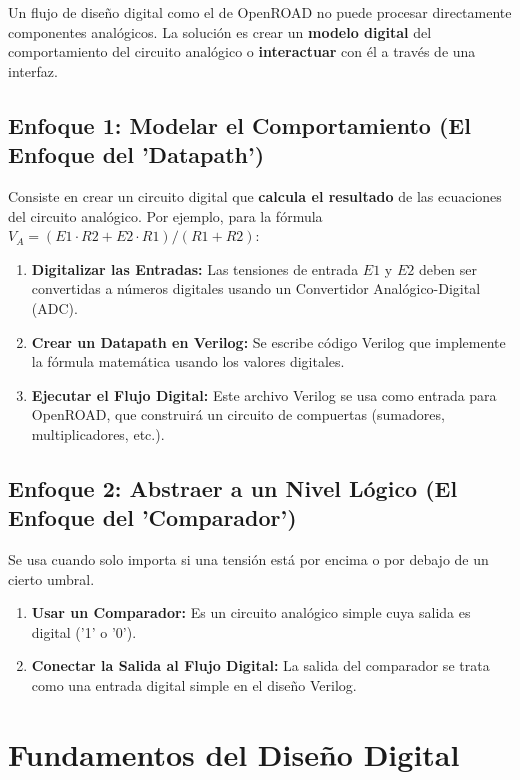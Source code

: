 \documentclass[12pt,a4paper]{article}
\begin{document}
Un flujo de diseño digital como el de OpenROAD no puede procesar directamente componentes analógicos. La solución es crear un \textbf{modelo digital} del comportamiento del circuito analógico o \textbf{interactuar} con él a través de una interfaz.

\subsection{Enfoque 1: Modelar el Comportamiento (El Enfoque del 'Datapath')}

Consiste en crear un circuito digital que \textbf{calcula el resultado} de las ecuaciones del circuito analógico. Por ejemplo, para la fórmula $V_A = (E1 \cdot R2 + E2 \cdot R1) / (R1 + R2)$:
\begin{enumerate}
    \item \textbf{Digitalizar las Entradas:} Las tensiones de entrada $E1$ y $E2$ deben ser convertidas a números digitales usando un Convertidor Analógico-Digital (ADC).
    \item \textbf{Crear un Datapath en Verilog:} Se escribe código Verilog que implemente la fórmula matemática usando los valores digitales.
    \item \textbf{Ejecutar el Flujo Digital:} Este archivo Verilog se usa como entrada para OpenROAD, que construirá un circuito de compuertas (sumadores, multiplicadores, etc.).
\end{enumerate}

\subsection{Enfoque 2: Abstraer a un Nivel Lógico (El Enfoque del 'Comparador')}

Se usa cuando solo importa si una tensión está por encima o por debajo de un cierto umbral.
\begin{enumerate}
    \item \textbf{Usar un Comparador:} Es un circuito analógico simple cuya salida es digital ('1' o '0').
    \item \textbf{Conectar la Salida al Flujo Digital:} La salida del comparador se trata como una entrada digital simple en el diseño Verilog.
\end{enumerate}

\newpage
\section{Fundamentos del Diseño Digital}
\end{document}
